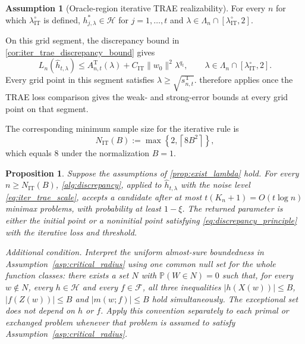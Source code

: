 \documentclass[12pt]{article}
\theoremstyle{plain}
\newtheorem{proposition}[theorem]{Proposition}
\theoremstyle{definition}
\newtheorem{assumption}[theorem]{Assumption}
\theoremstyle{remark}
\begin{document}
\begin{assumption}[Oracle-region iterative TRAE realizability]\label{asp:iter_realizability_trae}
For every $n$ for which $\lambda_{\mathrm{IT}}^\circ$ is defined,
$h_{j,\lambda}^*\in\mathcal H$ for $j=1,\ldots,t$ and
$\lambda\in\Lambda_n\cap[\lambda_{\mathrm{IT}}^\circ,2]$.
\end{assumption}
On this grid segment, the discrepancy bound in
\cref{cor:iter_trae_discrepancy_bound} gives
\begin{equation}\label{eq:iter_trae_discrepancy_bound}
L_n(\hat h_{t,\lambda})
\leqslant
A_{n,t}^{\mathrm T}(\lambda)
+C_{\mathrm{IT}}\|w_0\|^2\lambda^{q_t},
\qquad
\lambda\in\Lambda_n\cap[\lambda_{\mathrm{IT}}^\circ,2].
\end{equation}
Every grid point in this segment satisfies $\lambda\geqslant\sqrt{s_{n,t}^{\mathrm T}}$.
 therefore applies once the TRAE loss comparison gives
the weak- and strong-error bounds at every grid point on that segment.

The corresponding minimum sample size for the iterative rule is
\[
N_{\mathrm{IT}}(B) :=\max\left\{2,\left\lceil 8B^2\right\rceil\right\},
\]
which equals $8$ under the normalization $B=1$.

\begin{proposition}\label{prop:exist_lambda_iter_trae}
Suppose the assumptions of \cref{prop:exist_lambda} hold. For every $n\geqslant N_{\mathrm{IT}}(B)$, \cref{alg:discrepancy}, applied to $\hat h_{t,\lambda}$ with the noise level \eqref{eq:iter_trae_scale}, accepts a candidate after at most $t(K_n+1)=O(t\log n)$ minimax problems, with probability at least $1-\xi$. The returned parameter is either the initial point or a noninitial point satisfying \eqref{eq:discrepancy_principle} with the iterative loss and threshold.

\emph{Additional condition.} Interpret the uniform almost-sure boundedness in Assumption~\ref{asp:critical_radius} using one common null set for the whole function classes: there exists a set $N$ with $\mathbb P(W\in N)=0$ such that, for every $w\notin N$, every $h\in\mathcal H$ and every $f\in\mathcal F$, all three inequalities $|h(X(w))|\leqslant B$, $|f(Z(w))|\leqslant B$ and $|m(w;f)|\leqslant B$ hold simultaneously. The exceptional set does not depend on $h$ or $f$. Apply this convention separately to each primal or exchanged problem whenever that problem is assumed to satisfy Assumption~\ref{asp:critical_radius}.
\end{proposition}
\end{document}
